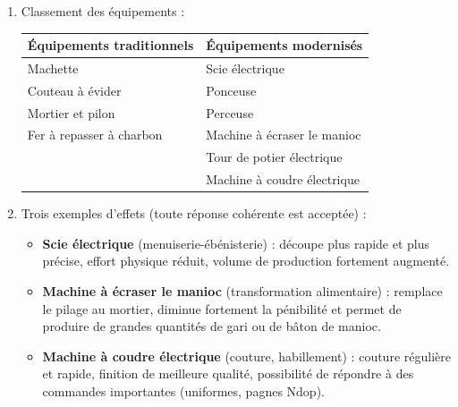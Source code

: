\documentclass[11pt]{article}
\begin{document}
\begin{corrige}
\begin{enumerate}
\item Classement des équipements :
\begin{center}
\begin{tabularx}{\linewidth}{|X|X|}
\hline
\rowcolor{popblueL} Équipements traditionnels & Équipements modernisés \\
\hline
Machette & Scie électrique \\
\hline
Couteau à évider & Ponceuse \\
\hline
Mortier et pilon & Perceuse \\
\hline
Fer à repasser à charbon & Machine à écraser le manioc \\
\hline
 & Tour de potier électrique \\
\hline
 & Machine à coudre électrique \\
\hline
\end{tabularx}
\end{center}

\item Trois exemples d'effets (toute réponse cohérente est acceptée) :
\begin{itemize}
\item \textbf{Scie électrique} (menuiserie-ébénisterie) : découpe plus rapide et plus précise, effort physique réduit, volume de production fortement augmenté.
\item \textbf{Machine à écraser le manioc} (transformation alimentaire) : remplace le pilage au mortier, diminue fortement la pénibilité et permet de produire de grandes quantités de gari ou de bâton de manioc.
\item \textbf{Machine à coudre électrique} (couture, habillement) : couture régulière et rapide, finition de meilleure qualité, possibilité de répondre à des commandes importantes (uniformes, pagnes Ndop).
\end{itemize}
\end{enumerate}
\end{corrige}
\end{document}
